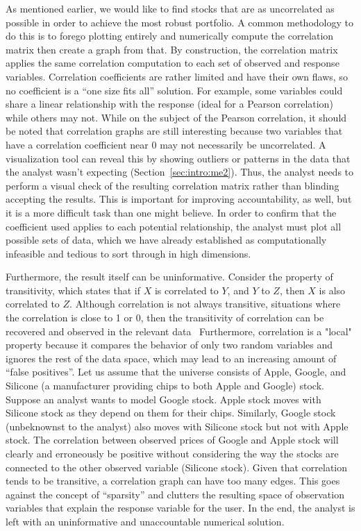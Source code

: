 As mentioned earlier, we would like to find stocks that are as uncorrelated as possible in order to achieve the most robust portfolio. A common methodology to do this is to forego plotting entirely and numerically compute the correlation matrix then create a graph from that. By construction, the correlation matrix applies the same correlation computation to each set of observed and response variables. Correlation coefficients are rather limited and have their own flaws, so no coefficient is a “one size fits all” solution. For example, some variables could share a linear relationship with the response (ideal for a Pearson correlation) while others may not. While on the subject of the Pearson correlation, it should be noted that correlation graphs are still interesting because two variables that have a correlation coefficient near 0 may not necessarily be uncorrelated. A visualization tool can reveal this by showing outliers or patterns in the data that the analyst wasn't expecting (Section~\ref{sec:intro:me2}). Thus, the analyst needs to perform a visual check of the resulting correlation matrix rather than blinding accepting the results. This is important for improving accountability, as well, but it is a more difficult task than one might believe. In order to confirm that the coefficient used applies to each potential relationship, the analyst must plot all possible sets of data, which we have already established as computationally infeasible and tedious to sort through in high dimensions.

Furthermore, the result itself can be uninformative. Consider the property of transitivity, which states that if $X$ is correlated to $Y$, and $Y$ to $Z$, then $X$ is also correlated to $Z$. Although correlation is not always transitive, situations where the correlation is close to 1 or 0, then the transitivity of correlation can be recovered and observed in the relevant data~\cite{tao2014} Furthermore, correlation is a "local" property because it compares the behavior of only two random variables and ignores the rest of the data space, which may lead to an increasing amount of ``false positives''. Let us assume that the universe consists of Apple, Google, and Silicone (a manufacturer providing chips to both Apple and Google) stock. Suppose an analyst wants to model Google stock. Apple stock moves with Silicone stock as they depend on them for their chips. Similarly, Google stock (unbeknownst to the analyst) also moves with Silicone stock but not with Apple stock. The correlation between observed prices of Google and Apple stock will clearly and erroneously be positive without considering the way the stocks are connected to the other observed variable (Silicone stock). Given that correlation tends to be transitive, a correlation graph can have too many edges. This goes against the concept of ``sparsity''  and clutters the resulting space of observation variables that explain the response variable for the user. In the end, the analyst is left with an uninformative and unaccountable numerical solution.

